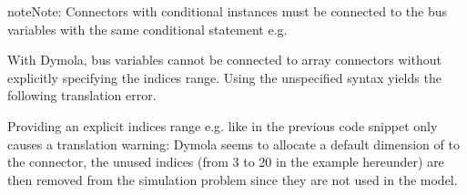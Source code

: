 \documentclass[letterpaper,10pt, openany,english]{sphinxmanual}
\begin{document}
\begin{sphinxadmonition}{note}{Note:}
Connectors with conditional instances must be connected to the bus variables with the same conditional statement e.g.

\begin{sphinxVerbatim}[commandchars=\\\{\}]
  
    \PYG{p}{[}\PYG{p}{],} \PYG{p}{[}\PYG{p}{])}
 
\end{sphinxVerbatim}

With Dymola, bus variables cannot be connected to array connectors without explicitly specifying the indices range.
Using the unspecified \sphinxcode{\sphinxupquote{{[}:{]}}} syntax yields the following translation error.

\begin{sphinxVerbatim}[commandchars=\\\{\}]
   \PYG{p}{[}\PYG{p}{]}       \PYG{p}{[}\PYG{p}{],} \PYG{p}{[}\PYG{p}{]);}
\end{sphinxVerbatim}

Providing an explicit indices range e.g. \sphinxcode{\sphinxupquote{{[}1:numZon{]}}} like in the previous code snippet only causes a translation warning: Dymola seems to allocate a default dimension of  to the connector, the unused indices (from 3 to 20 in the example hereunder) are then removed from the simulation problem since they are not used in the model.

\begin{sphinxVerbatim}[commandchars=\\\{\}]
   \PYG{p}{[}\PYG{p}{]}        


\end{sphinxVerbatim}
\end{sphinxadmonition}
\end{document}
